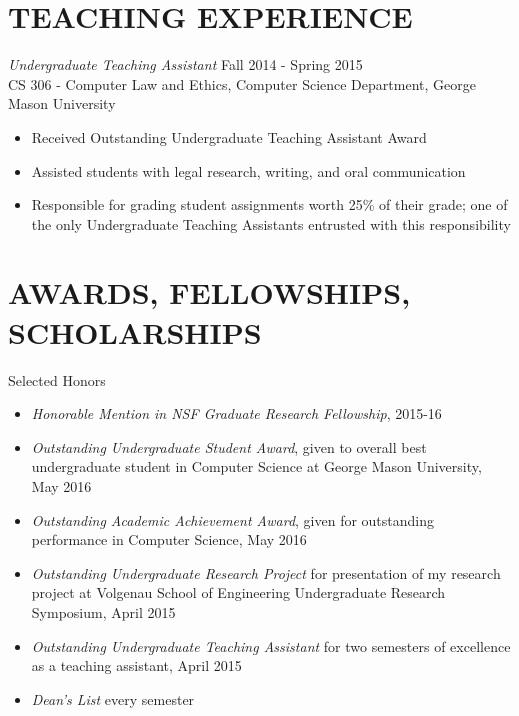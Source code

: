 \documentclass[margin, 10pt]{res} %
\begin{document}
\begin{resume}
 
\section{TEACHING EXPERIENCE}

{\sl Undergraduate Teaching Assistant} \hfill Fall 2014 - Spring 2015 \\
CS 306 - Computer Law and Ethics, Computer Science Department, George Mason University
\begin{itemize} \itemsep -2pt %
\item Received Outstanding Undergraduate Teaching Assistant Award 
\item Assisted students with legal research, writing, and oral communication
\item Responsible for grading student assignments worth 25\% of their grade; one of the only Undergraduate Teaching Assistants entrusted with this responsibility
\end{itemize} 


\section{AWARDS, FELLOWSHIPS, SCHOLARSHIPS} 

Selected Honors
\begin{itemize} \itemsep -2pt %
\item {\sl Honorable Mention in NSF Graduate Research Fellowship}, 2015-16
\item {\sl Outstanding Undergraduate Student Award}, given to overall best undergraduate student in Computer Science at George Mason University, May 2016
\item {\sl Outstanding Academic Achievement Award}, given for outstanding performance in Computer Science, May 2016
\item {\sl Outstanding Undergraduate Research Project} for presentation of my research project at Volgenau School of Engineering Undergraduate Research Symposium, April 2015
\item {\sl Outstanding Undergraduate Teaching Assistant} for two semesters of excellence as a teaching assistant, April 2015
\item {\sl Dean's List} every semester
\end{itemize}


\end{resume}
\end{document}
